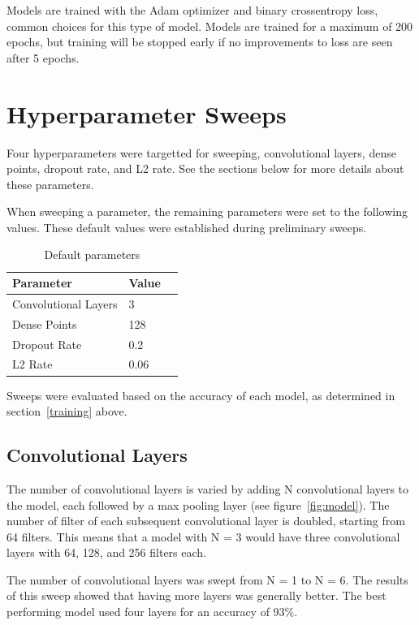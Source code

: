 \documentclass{article}
\begin{document}
Models are trained with the Adam optimizer and binary crossentropy loss, common choices for this type of model. Models are trained for a maximum of 200 epochs, but training will be stopped early if no improvements to loss are seen after 5 epochs.


\section{Hyperparameter Sweeps}

Four hyperparameters were targetted for sweeping, convolutional layers, dense points, dropout rate, and L2 rate. See the sections below for more details about these parameters.

When sweeping a parameter, the remaining parameters were set to the following values. These default values were established during preliminary sweeps.

\begin{table}[H]
    \caption{Default parameters}
    \label{parameters}
    \centering
    \begin{tabular}{lll}
      \toprule
      Parameter     & Value  \\
      \midrule
      Convolutional Layers & 3     \\
      Dense Points     & 128     \\
      Dropout Rate     & 0.2  \\
      L2 Rate     & 0.06  \\
      \bottomrule
    \end{tabular}
  \end{table}

Sweeps were evaluated based on the accuracy of each model, as determined in section~\ref{training} above. 


\subsection{Convolutional Layers}

The number of convolutional layers is varied by adding N convolutional layers to the model, each followed by a max pooling layer (see figure~\ref{fig:model}). The number of filter of each subsequent convolutional layer is doubled, starting from 64 filters. This means that a model with N = 3 would have three convolutional layers with 64, 128, and 256 filters each.

The number of convolutional layers was swept from N = 1 to N = 6. The results of this sweep showed that having more layers was generally better. The best performing model used four layers for an accuracy of 93\%. 
\end{document}
